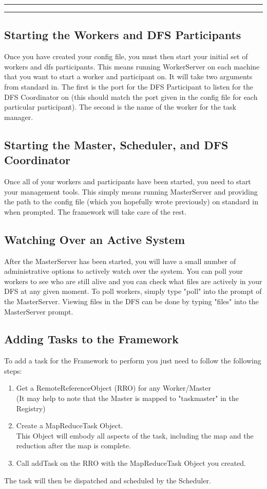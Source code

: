 \documentclass[11pt]{article}
\newcounter{questionCounter}
\newcounter{partCounter}[questionCounter]
\newenvironment{question}[2][\arabic{questionCounter}]{%
    \setcounter{partCounter}{0}%
    \vspace{.25in} \hrule \vspace{0.5em}%
        \noindent{\bf #2}%
    \vspace{0.8em} \hrule \vspace{.10in}%
    \addtocounter{questionCounter}{1}%
}{}
\begin{document}
\begin{question}{Section 2 - Administration and Configuration}
\subsection*{Starting the Workers and DFS Participants}
Once you have created your config file, you must then start your initial set of workers and dfs participants. This means running WorkerServer on each machine that you want to start a worker and participant on. It will take two arguments from standard in. The first is the port for the DFS Participant to listen for the DFS Coordinator on (this should match the port given in the config file for each particular participant). The second is the name of the worker for the task manager.

\subsection*{Starting the Master, Scheduler, and DFS Coordinator}
Once all of your workers and participants have been started, you need to start your management tools. This simply means running MasterServer and providing the path to the config file (which you hopefully wrote previously) on standard in when prompted. The framework will take care of the rest.

\subsection*{Watching Over an Active System}
After the MasterServer has been started, you will have a small number of administrative options to actively watch over the system. You can poll your workers to see who are still alive and you can check what files are actively in your DFS at any given moment. To poll workers, simply type "poll" into the prompt of the MasterServer. Viewing files in the DFS can be done by typing "files" into the MasterServer prompt.

\subsection*{Adding Tasks to the Framework}
To add a task for the Framework to perform you just need to follow the following steps:
\begin{enumerate}
\item Get a RemoteReferenceObject (RRO) for any Worker/Master\\
(It may help to note that the Master is mapped to "taskmaster" in the Registry)
\item Create a MapReduceTask Object. \\
This Object will embody all aspects of the task, including the map and the reduction after the map is complete.
\item Call addTask on the RRO with the MapReduceTask Object you created.
\end{enumerate}

The task will then be dispatched and scheduled by the Scheduler.

\end{question}
\end{document}
